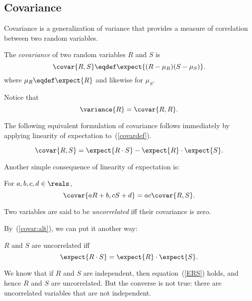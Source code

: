 \subsection{Covariance}
Covariance is a generalization of variance that provides a measure of
correlation between two random variables.

\begin{definition*}
The \emph{covariance} of two random variables $R$ and $S$ is
\begin{equation}\label{covardef}
\covar{R,S} \eqdef \expect{(R - \mu_R)(S - \mu_S)}.
\end{equation}
where $\mu_R \eqdef \expect{R}$ and likewise for $\mu_S$.
\end{definition*}

Notice that
\[
\variance{R} = \covar{R,R}.
\]

The following equivalent formulation of covariance follows immediately by
applying linearity of expectation to~(\ref{covardef}).
\begin{lemma*}
\begin{equation}\label{covar:alt}
\covar{R,S} = \expect{R\cdot S} - \expect{R} \cdot \expect{S}.
\end{equation}
\end{lemma*}

Another simple consequence of linearity of expectation is:
\begin{lemma*}For $a,b,c,d \in \reals$,
\begin{equation}\label{covaraR}
\covar{aR+b,cS+d} = ac\covar{R,S}.
\end{equation}
\end{lemma*}

\begin{definition*}
Two variables are said to be \emph{uncorrelated} iff their covariance is
zero.
\end{definition*}

By~(\ref{covar:alt}), we can put it another way:
\begin{lemma*}
$R$ and $S$ are uncorrelated iff
\begin{equation}\label{ERS}
\expect{R\cdot S} = \expect{R} \cdot \expect{S}.
\end{equation}
\end{lemma*}

We know that if $R$ and $S$ are independent, then equation~(\ref{ERS})
holds, and hence $R$ and $S$ are uncorrelated.  But the converse is not
true: there are uncorrelated variables that are not independent.

